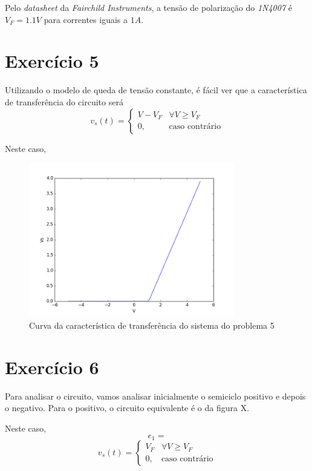 \documentclass[12pt, a4paper, twoside]{article}
\begin{document}
Pelo \textit{datasheet} da \textit{Fairchild Instruments}, a tensão de polarização
do \textit{1N4007} é $V_F = 1.1V$ para correntes iguais a $1A$.

\section{Exercício 5}


Utilizando o modelo de queda de tensão constante, é fácil ver que a característica
de transferência do circuito será
\begin{equation}
    v_s(t) =
    \begin{cases}
        V - V_F & \forall V \geq V_F \\
        0, & \text{caso contrário}
    \end{cases}
\end{equation}

Neste caso,
\begin{figure}
    \centering
    \includegraphics[width=0.8\textwidth]{figs/rel3/ex5.png}
    \caption{Curva da característica de transferência do sistema do problema 5}
\end{figure}

\section{Exercício 6}

Para analisar o circuito, vamos analisar inicialmente o semiciclo positivo e depois
o negativo. Para o positivo, o circuito equivalente é o da figura X.


Neste caso,
$$ e_1 =  $$
\begin{equation}
    v_s(t) =
    \begin{cases}
        V_F & \forall V \geq V_F \\
        0, & \text{caso contrário}
    \end{cases}
\end{equation}
\end{document}

